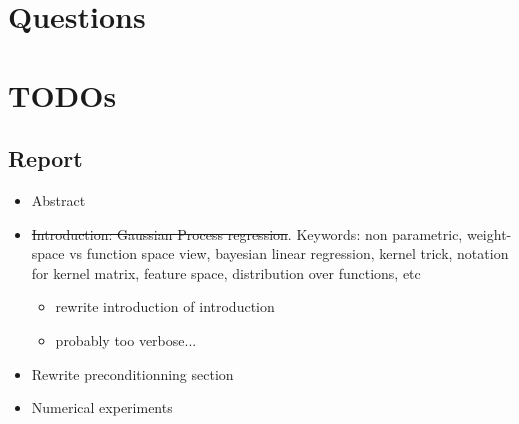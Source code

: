 \documentclass{article}
\newcommand{\vect}[1]{\boldsymbol{\mathbf{#1}}}
\begin{document}

\section{Questions}


\section{TODOs}

\subsection{Report}

\begin{itemize}
    \item Abstract
    \item \st{Introduction: Gaussian Process regression}. Keywords: non parametric, weight-space vs function space view, bayesian linear regression, kernel trick, notation for kernel matrix, feature space, distribution over functions, etc
    \begin{itemize}
        \item rewrite introduction of introduction
        \item probably too verbose...
    \end{itemize}
    \item Rewrite preconditionning section
    \item Numerical experiments
\end{itemize}
\end{document}
